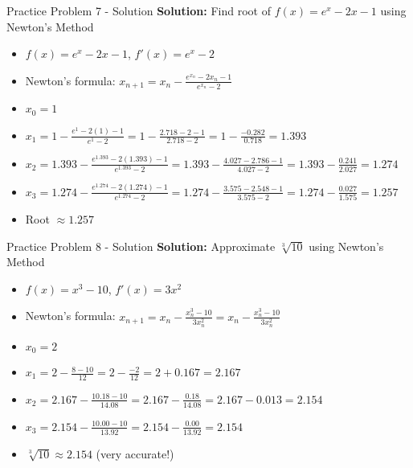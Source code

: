 \documentclass[aspectratio=169]{beamer}
\begin{document}
\begin{frame}{Practice Problem 7 - Solution}
\textbf{Solution:} Find root of $f(x) = e^x - 2x - 1$ using Newton's Method

\begin{itemize}
    \item $f(x) = e^x - 2x - 1$, $f'(x) = e^x - 2$
    \item Newton's formula: $x_{n+1} = x_n - \frac{e^{x_n} - 2x_n - 1}{e^{x_n} - 2}$
    \item $x_0 = 1$
    \item $x_1 = 1 - \frac{e^1 - 2(1) - 1}{e^1 - 2} = 1 - \frac{2.718 - 2 - 1}{2.718 - 2} = 1 - \frac{-0.282}{0.718} = 1.393$
    \item $x_2 = 1.393 - \frac{e^{1.393} - 2(1.393) - 1}{e^{1.393} - 2} = 1.393 - \frac{4.027 - 2.786 - 1}{4.027 - 2} = 1.393 - \frac{0.241}{2.027} = 1.274$
    \item $x_3 = 1.274 - \frac{e^{1.274} - 2(1.274) - 1}{e^{1.274} - 2} = 1.274 - \frac{3.575 - 2.548 - 1}{3.575 - 2} = 1.274 - \frac{0.027}{1.575} = 1.257$
    \item Root $\approx 1.257$
\end{itemize}
\end{frame}

\begin{frame}{Practice Problem 8 - Solution}
\textbf{Solution:} Approximate $\sqrt[3]{10}$ using Newton's Method

\begin{itemize}
    \item $f(x) = x^3 - 10$, $f'(x) = 3x^2$
    \item Newton's formula: $x_{n+1} = x_n - \frac{x_n^3 - 10}{3x_n^2} = x_n - \frac{x_n^3 - 10}{3x_n^2}$
    \item $x_0 = 2$
    \item $x_1 = 2 - \frac{8 - 10}{12} = 2 - \frac{-2}{12} = 2 + 0.167 = 2.167$
    \item $x_2 = 2.167 - \frac{10.18 - 10}{14.08} = 2.167 - \frac{0.18}{14.08} = 2.167 - 0.013 = 2.154$
    \item $x_3 = 2.154 - \frac{10.00 - 10}{13.92} = 2.154 - \frac{0.00}{13.92} = 2.154$
    \item $\sqrt[3]{10} \approx 2.154$ (very accurate!)
\end{itemize}
\end{frame}
\end{document}
